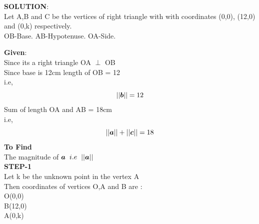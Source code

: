 \documentclass[10pt,a4paper]{report}
\begin{document}
\begin{multicols}{2}
\raggedright \textbf{SOLUTION}:\vspace{2mm}\\
Let A,B and C be the vertices of right triangle with with coordinates (0,0), (12,0) and (0,k) respectively.\vspace{2mm}\\
OB-Base.
AB-Hypotenuse.
OA-Side.\\\vspace{2mm}
\raggedright \textbf{Given}:\vspace{2mm}\\
Since its a right triangle OA $\perp$ OB \\\vspace{2mm}
Since base is 12cm length of OB = 12  \\i.e,\\
\begin{equation}
||\boldsymbol{b}||= 12 \vspace{2mm}
\end{equation}
Sum of length OA and AB = 18cm \\ i.e,\\
\begin{equation}
||\boldsymbol{a}|| + ||\boldsymbol{c}||= 18 \vspace{2mm}
\end{equation}
\textbf{To Find}\vspace{2mm}\\
The magnitude of $\boldsymbol{a} \hspace{2mm} i.e \hspace{2mm}  ||\boldsymbol{a}||$\\\vspace{2mm}
\textbf{STEP-1}\vspace{2mm}\\
Let k be the unknown point in the vertex A \vspace{2mm}\\
Then coordinates of vertices  O,A and B are :\vspace{2mm}\\
 O(0,0)\vspace{1mm} \\ B(12,0)\vspace{1mm} \\A(0,k)\vspace{1mm} \\

\end{multicols}
\end{document}
